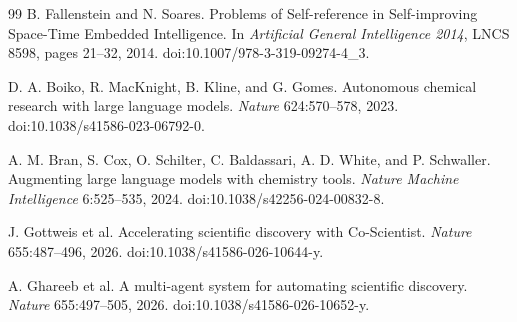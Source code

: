 \begin{thebibliography}{99}
B. Fallenstein and N. Soares. Problems of Self-reference in Self-improving Space-Time Embedded Intelligence. In \emph{Artificial General Intelligence 2014}, LNCS 8598, pages 21--32, 2014. doi:10.1007/978-3-319-09274-4\_3.

D. A. Boiko, R. MacKnight, B. Kline, and G. Gomes. Autonomous chemical research with large language models. \emph{Nature} 624:570--578, 2023. doi:10.1038/s41586-023-06792-0.

A. M. Bran, S. Cox, O. Schilter, C. Baldassari, A. D. White, and P. Schwaller. Augmenting large language models with chemistry tools. \emph{Nature Machine Intelligence} 6:525--535, 2024. doi:10.1038/s42256-024-00832-8.

J. Gottweis et al. Accelerating scientific discovery with Co-Scientist. \emph{Nature} 655:487--496, 2026. doi:10.1038/s41586-026-10644-y.

A. Ghareeb et al. A multi-agent system for automating scientific discovery. \emph{Nature} 655:497--505, 2026. doi:10.1038/s41586-026-10652-y.

\end{thebibliography}
